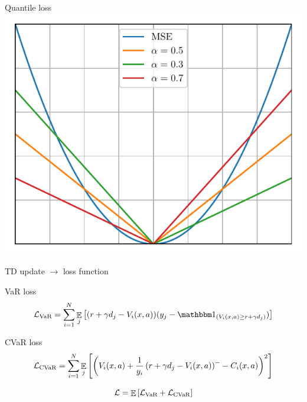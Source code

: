\documentclass{beamer}
\begin{document}

\begin{frame}{Quantile loss}
\center
\includegraphics[width=0.7\linewidth]{../gfx/losses.pdf}

\end{frame}


\begin{frame}{TD update $\to$ loss function}
\begin{block}{VaR loss}
$$\mathcal{L}_{\var}=\sum_{i=1}^{N} \expect_j\bsquare{(r + \gamma d_j - V_i(x, a))(y_j - \indicator_{(V_i(x, a) \ge r + \gamma d_j)})}$$
\end{block}

\begin{block}{CVaR loss}
$$
\mathcal{L}_{\text{CVaR}}=\sum_{i=1}^{N} \mathop{\mathbb{E}}_j\left[ {\left( {V_i(x, a) + \frac{1}{y_i} \left( {r + \gamma d_j - V_i(x, a)} \right)^- - C_i(x, a)} \right)^2} \right]
$$
\end{block}
$$\mathcal{L} = \mathop{\mathbb{E}}\left[\mathcal{L}_{\text{VaR}} + \mathcal{L}_{\text{CVaR}} \right]$$

\end{frame}

\end{document}
